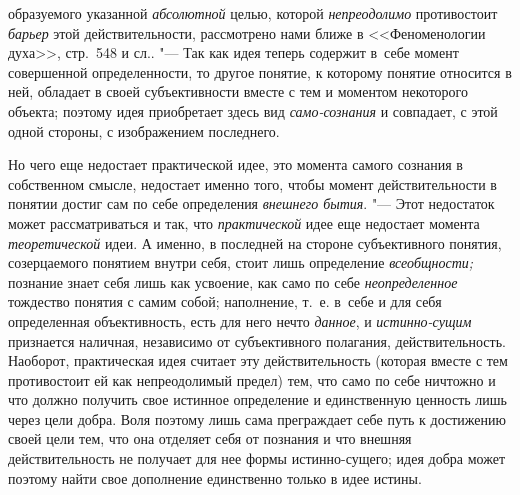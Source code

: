 образуемого указанной {\em абсолютной}
целью, которой
{\em непреодолимо}
противостоит {\em барьер}
этой действительности, рассмотрено нами ближе в
<<Феноменологии духа>>, стр.~548 и
сл..
"--- Так как идея теперь содержит в~себе момент совершенной
определенности, то другое понятие, к которому понятие относится в ней,
обладает в своей субъективности вместе с тем и моментом некоторого объекта;
поэтому идея приобретает здесь вид
{\em само-сознания}
и совпадает, с этой одной стороны, с изображением
последнего.

Но чего еще недостает практической идее, это момента самого
сознания в собственном
смысле,
недостает именно того, чтобы момент действительности в
понятии достиг сам по себе определения
{\em внешнего бытия}. "---
Этот недостаток может рассматриваться и так, что
{\em практической} идее
еще недостает момента
{\em теоретической} идеи.
А именно, в последней на стороне субъективного понятия, созерцаемого
понятием внутри себя, стоит лишь определение
{\em всеобщности;}
познание знает себя лишь как усвоение, как само по себе
{\em неопределенное}
тождество понятия с самим собой; наполнение, т.~е. в~себе и
для себя определенная объективность, есть для него нечто
{\em данное}, и
{\em истинно-сущим}
признается наличная, независимо от субъективного полагания,
действительность. Наоборот, практическая идея считает эту действительность
(которая вместе с тем противостоит ей как непреодолимый предел) тем, что
само по себе ничтожно и что должно получить свое истинное определение и
единственную ценность лишь через цели добра. Воля поэтому лишь сама
преграждает себе путь к достижению своей цели тем, что она отделяет себя от
познания и что внешняя действительность не получает для нее формы
истинно-сущего; идея добра может поэтому найти свое дополнение единственно
только в идее истины.

